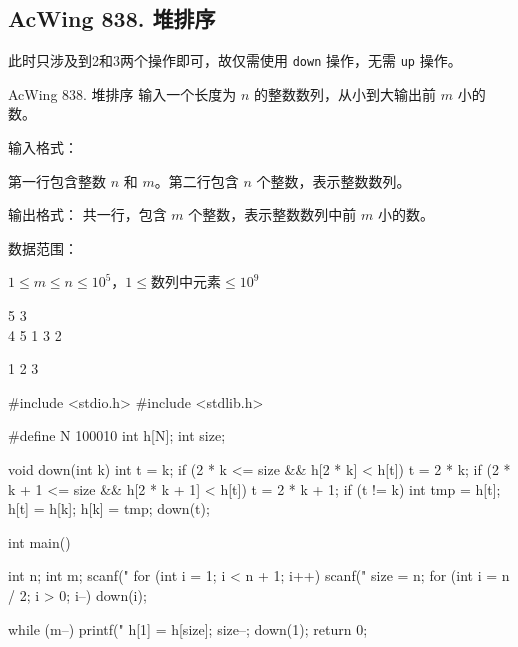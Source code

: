 \subsection{AcWing 838. 堆排序}
此时只涉及到2和3两个操作即可，故仅需使用 \lstinline{down} 操作，无需 \lstinline{up} 操作。

\begin{titledbox}{AcWing 838. 堆排序}
    输入一个长度为 $n$ 的整数数列，从小到大输出前 $m$ 小的数。

    输入格式：

    第一行包含整数 $n$ 和 $m$。第二行包含 $n$ 个整数，表示整数数列。

    输出格式：
    共一行，包含 $m$ 个整数，表示整数数列中前 $m$ 小的数。

    数据范围：

    $1 \le m \le n \le 10^5$，$1 \le 数列中元素 \le 10^9$

    \begin{inputblock}
        5 3 \\
        4 5 1 3 2
    \end{inputblock}
    \begin{outputblock}
        1 2 3
    \end{outputblock}

\end{titledbox}

\begin{mycpptwocol}[堆排序]
    #include <stdio.h>
    #include <stdlib.h>

    #define N 100010
    int h[N];
    int size;

    void down(int k)
        {
        int t = k;
        if (2 * k <= size && h[2 * k] < h[t]) {
            t = 2 * k;
        }
        if (2 * k + 1 <= size && h[2 * k + 1] < h[t]) {
            t = 2 * k + 1;
        }
        if (t != k) {
            int tmp = h[t];
            h[t] = h[k];
            h[k] = tmp;
            down(t);
        }
    }

    int main()
        {
        int n;
        int m;
        scanf("%
        for (int i = 1; i < n + 1; i++) {
            scanf("%
        }
        size = n;
        for (int i = n / 2; i > 0; i--) {
            down(i);
        }

        while (m--) {
            printf("%
            h[1] = h[size];
            size--;
            down(1);
        }
        return 0;
    }
\end{mycpptwocol}

